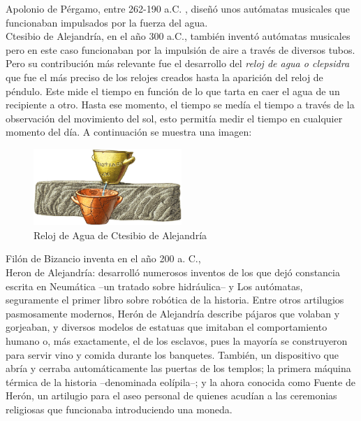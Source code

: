 \documentclass[paper=a4, fontsize=11pt]{scrartcl}
\begin{document}
Apolonio de Pérgamo, entre 262-190 a.C. , diseñó unos autómatas musicales que funcionaban impulsados por la fuerza del agua.\\


Ctesibio de Alejandría, en el año 300 a.C., también inventó autómatas musicales pero en este caso funcionaban por la impulsión de aire a través de diversos tubos. Pero su contribución más relevante fue el desarrollo del \textit{reloj de agua o clepsidra} que fue el más preciso de los relojes creados hasta la aparición del reloj de péndulo. Este mide el tiempo en función de lo que tarta en caer el agua de un recipiente a otro. Hasta ese momento, el tiempo se medía el tiempo a través de la observación del movimiento del sol, esto permitía medir el tiempo en cualquier momento del día. A continuación se muestra una imagen:\\

	
\begin{figure}[H]
\begin{center}
  \includegraphics[width=0.5\textwidth]{imagenes/reloj.png}
  \caption{Reloj de Agua de Ctesibio de Alejandría}
  \label{reloj}
\end{center}
\end{figure}



Filón de Bizancio inventa en el año 200 a. C.,\\

Heron de Alejandría: desarrolló numerosos inventos de los que dejó constancia escrita en Neumática –un tratado sobre hidráulica– y Los autómatas, seguramente el primer libro sobre robótica de la historia. Entre otros artilugios pasmosamente modernos, Herón de Alejandría describe pájaros que volaban y gorjeaban, y diversos modelos de estatuas que imitaban el comportamiento humano o, más exactamente, el de los esclavos, pues la mayoría se construyeron para servir vino y comida durante los banquetes. También, un dispositivo que abría y cerraba automáticamente las puertas de los templos; la primera máquina térmica de la historia –denominada eolípila–; y la ahora conocida como Fuente de Herón, un artilugio para el aseo personal de quienes acudían a las ceremonias religiosas que funcionaba introduciendo una moneda.\\
\end{document}
